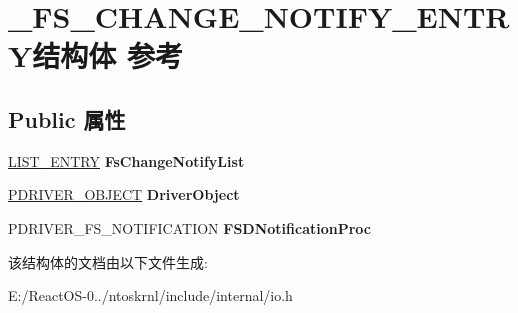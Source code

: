 \hypertarget{struct___f_s___c_h_a_n_g_e___n_o_t_i_f_y___e_n_t_r_y}{}\section{\+\_\+\+F\+S\+\_\+\+C\+H\+A\+N\+G\+E\+\_\+\+N\+O\+T\+I\+F\+Y\+\_\+\+E\+N\+T\+R\+Y结构体 参考}
\label{struct___f_s___c_h_a_n_g_e___n_o_t_i_f_y___e_n_t_r_y}
\subsection*{Public 属性}
\begin{DoxyCompactItemize}
\item 
\mbox{\label{struct___f_s___c_h_a_n_g_e___n_o_t_i_f_y___e_n_t_r_y_a65c9dbde5f7b75c1495795e377296eec}} 
\hyperlink{struct___l_i_s_t___e_n_t_r_y}{L\+I\+S\+T\+\_\+\+E\+N\+T\+RY} {\bfseries Fs\+Change\+Notify\+List}
\item 
\mbox{\label{struct___f_s___c_h_a_n_g_e___n_o_t_i_f_y___e_n_t_r_y_a8436ff10548ecde4ba8e980297415e32}} 
\hyperlink{struct___d_r_i_v_e_r___o_b_j_e_c_t}{P\+D\+R\+I\+V\+E\+R\+\_\+\+O\+B\+J\+E\+CT} {\bfseries Driver\+Object}
\item 
\mbox{\label{struct___f_s___c_h_a_n_g_e___n_o_t_i_f_y___e_n_t_r_y_a5e75e63300a3ff245d7dfb6fe6fe2f44}} 
P\+D\+R\+I\+V\+E\+R\+\_\+\+F\+S\+\_\+\+N\+O\+T\+I\+F\+I\+C\+A\+T\+I\+ON {\bfseries F\+S\+D\+Notification\+Proc}
\end{DoxyCompactItemize}


该结构体的文档由以下文件生成\+:\begin{DoxyCompactItemize}
\item 
E\+:/\+React\+O\+S-\/0../ntoskrnl/include/internal/io.\+h\end{DoxyCompactItemize}
